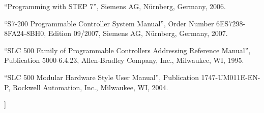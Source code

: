 \noindent
``Programming with STEP 7'', Siemens AG, N\"urnberg, Germany, 2006.

\vskip 10pt

\noindent
``S7-200 Programmable Controller System Manual'', Order Number 6ES7298-8FA24-8BH0, Edition 09/2007, Siemens AG, N\"urnberg, Germany, 2007.

\vskip 10pt

\noindent
``SLC 500 Family of Programmable Controllers Addressing Reference Manual'', Publication 5000-6.4.23, Allen-Bradley Company, Inc., Milwaukee, WI, 1995.

\vskip 10pt

\noindent
``SLC 500 Modular Hardware Style User Manual'', Publication 1747-UM011E-EN-P, Rockwell Automation, Inc., Milwaukee, WI, 2004.















]
